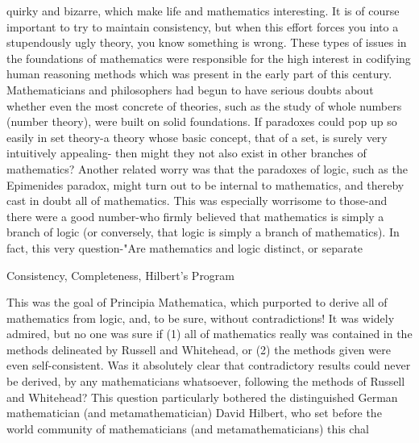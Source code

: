 






quirky and bizarre, which make life and mathematics interesting. It is of course important to try to maintain consistency, but when this effort forces you into a stupendously ugly theory, you know something is wrong. These types of issues in the foundations of mathematics were responsible for the high interest in codifying human reasoning methods which was present in the early part of this century. Mathematicians and philosophers had begun to have serious doubts about whether even the most concrete of theories, such as the study of whole numbers (number theory), were built on solid foundations. If paradoxes could pop up so easily in set theory-a theory whose basic concept, that of a set, is surely very intuitively appealing- then might they not also exist in other branches of mathematics? Another related worry was that the paradoxes of logic, such as the Epimenides paradox, might turn out to be internal to mathematics, and thereby cast in doubt all of mathematics. This was especially worrisome to those-and there were a good number-who firmly believed that mathematics is simply a branch of logic (or conversely, that logic is simply a branch of mathematics). In fact, this very question-"Are mathematics and logic distinct, or separate%

Consistency, Completeness, Hilbert's Program 

This was the goal of Principia Mathematica, which purported to derive all of mathematics from logic, and, to be sure, without contradictions! It was widely admired, but no one was sure if (1) all of mathematics really was contained in the methods delineated by Russell and Whitehead, or (2) the methods given were even self-consistent. Was it absolutely clear that contradictory results could never be derived, by any mathematicians whatsoever, following the methods of Russell and Whitehead? This question particularly bothered the distinguished German mathematician (and metamathematician) David Hilbert, who set before the world community of mathematicians (and metamathematicians) this chal 







